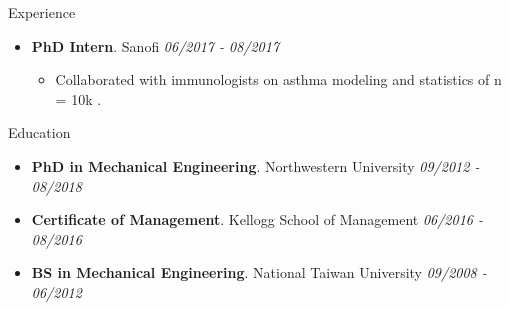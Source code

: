 \documentclass{resume} %
\begin{document}
\begin{rSection}{Experience}
\begin{itemize}[leftmargin=0em]
			\item {\bf PhD Intern}{. Sanofi } \hfill {\em 06/2017 - 08/2017}\\
			\vspace{-5mm}
			\begin{itemize}
				\setlength\itemsep{-1.5em}	
				\item Collaborated with immunologists on asthma modeling and statistics of n = 10k \underline{}.
			\end{itemize}	
			
		\end{itemize}
		
	\end{rSection}
	
	
	
	\begin{rSection}{Education}
		\begin{itemize}[leftmargin=0em]
			\item {\bf PhD in Mechanical Engineering}{. Northwestern University} \hfill {\em 09/2012 - 08/2018} 
			\vspace{-2mm}
			\item {\bf Certificate of Management}{. Kellogg School of Management} \hfill {\em 06/2016 - 08/2016} 
			\vspace{-2mm}
			\item {\bf BS in Mechanical Engineering}{. National Taiwan University} \hfill {\em 09/2008 - 06/2012} 
			\vspace{-2mm}
		\end{itemize}
				
	\end{rSection}
	
\end{document}

